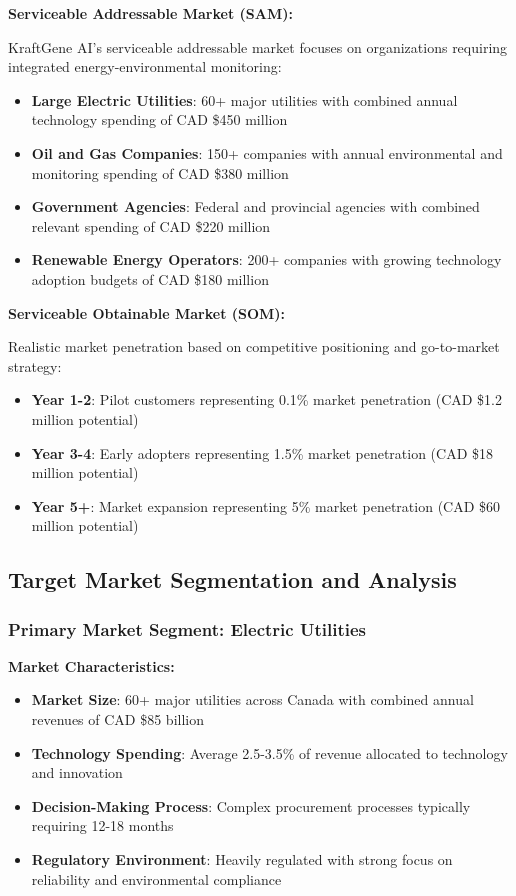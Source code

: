 \textbf{Serviceable Addressable Market (SAM):}

KraftGene AI's serviceable addressable market focuses on organizations requiring integrated energy-environmental monitoring:

\begin{itemize}
    \item \textbf{Large Electric Utilities}: 60+ major utilities with combined annual technology spending of CAD \$450 million
    \item \textbf{Oil and Gas Companies}: 150+ companies with annual environmental and monitoring spending of CAD \$380 million
    \item \textbf{Government Agencies}: Federal and provincial agencies with combined relevant spending of CAD \$220 million
    \item \textbf{Renewable Energy Operators}: 200+ companies with growing technology adoption budgets of CAD \$180 million
\end{itemize}

\textbf{Serviceable Obtainable Market (SOM):}

Realistic market penetration based on competitive positioning and go-to-market strategy:

\begin{itemize}
    \item \textbf{Year 1-2}: Pilot customers representing 0.1\% market penetration (CAD \$1.2 million potential)
    \item \textbf{Year 3-4}: Early adopters representing 1.5\% market penetration (CAD \$18 million potential)
    \item \textbf{Year 5+}: Market expansion representing 5\% market penetration (CAD \$60 million potential)
\end{itemize}

\subsection{Target Market Segmentation and Analysis}

\subsubsection{Primary Market Segment: Electric Utilities}

\textbf{Market Characteristics:}
\begin{itemize}
    \item \textbf{Market Size}: 60+ major utilities across Canada with combined annual revenues of CAD \$85 billion
    \item \textbf{Technology Spending}: Average 2.5-3.5\% of revenue allocated to technology and innovation
    \item \textbf{Decision-Making Process}: Complex procurement processes typically requiring 12-18 months
    \item \textbf{Regulatory Environment}: Heavily regulated with strong focus on reliability and environmental compliance
\end{itemize}

